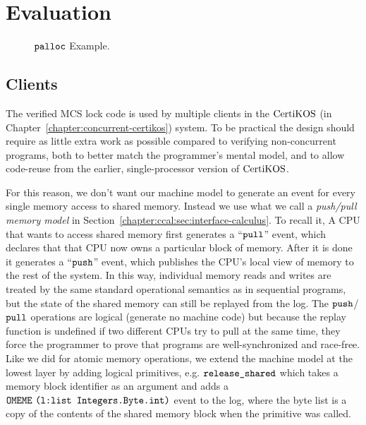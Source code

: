
\section{Evaluation}
\label{sec:evaluation}

\begin{figure}
\begin{minipage}{\linewidth}
\noindent
\begin{multicols}{2}


\end{multicols}
\end{minipage}
\caption{${\mathrm{\texttt{palloc}}}$ Example.}
\label{fig:chapter:mcslock:palloc-example}
\end{figure}

\subsection{Clients}

The verified MCS lock code is used by multiple clients in the $\mathrm{CertiKOS}$ (in Chapter~\ref{chapter:concurrent-certikos})
system. To be practical the design should require as little extra work
as possible compared to verifying non-concurrent programs, both to
better match the programmer's mental model, and to allow code-reuse
from the earlier, single-processor version of $\mathrm{CertiKOS}$.

For this reason, we don't want our machine model to generate an event
for every single memory access to shared memory. Instead we use what
we call a \emph{push/pull memory model} in Section~\ref{chapter:ccal:sec:interface-calculus}.
To recall it,
 A CPU that wants to access shared memory first generates a ``${\mathrm{\texttt{pull}}}$''
event, which declares that that CPU now owns a particular block of
memory. After it is done it generates a ``${\mathrm{\texttt{push}}}$'' event, which
publishes the CPU's local view of memory to the rest of the system. In
this way, individual memory reads and writes are treated by the same
standard operational semantics as in sequential programs, but the
state of the shared memory can still be replayed from the log.  The
${\mathrm{\texttt{push}}}$/${\mathrm{\texttt{pull}}}$ operations are logical (generate no machine code) but
because the replay function is undefined if two different CPUs try to
pull at the same time, they force the programmer to prove that
programs are well-synchronized and race-free. Like we did for atomic
memory operations, we extend the machine model at the lowest layer by
adding logical primitives, e.g. ${\mathrm{\texttt{release\_shared}}}$ which takes a
memory block identifier as an argument and adds a
${\mathrm{\texttt{OMEME}}}~{{\mathrm{\texttt{(l:list Integers.Byte.int)}}}}$ event to the log, where the byte list is a
copy of the contents of the shared memory block when the primitive was
called.

